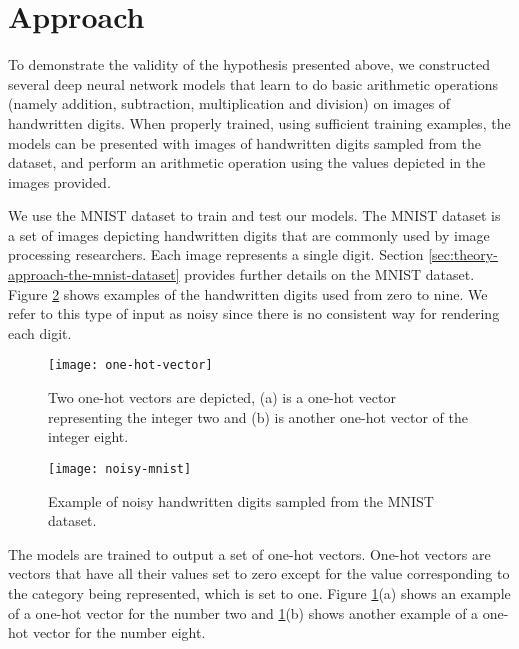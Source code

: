 \section{Approach} \label{sec:theory-approach}

To demonstrate the validity of the hypothesis presented above, we constructed several deep neural network models that learn to do basic arithmetic operations (namely addition, subtraction, multiplication and division) on images of handwritten digits. When properly trained, using sufficient training examples, the models can be presented with images of handwritten digits sampled from the dataset, and perform an arithmetic operation using the values depicted in the images provided.

We use the MNIST dataset to train and test our models. The MNIST dataset is a set of images depicting handwritten digits that are commonly used by image processing researchers\cite{MNIST}. Each image represents a single digit. Section \ref{sec:theory-approach-the-mnist-dataset} provides further details on the MNIST dataset. Figure \ref{fig:noisy-mnist} shows examples of the handwritten digits used from zero to nine. We refer to this type of input as noisy since there is no consistent way for rendering each digit. 

\begin{figure}[t]
	\centering
	\texttt{[image: one-hot-vector]}
	\caption{Two one-hot vectors are depicted, (a) is a one-hot vector representing the integer two and (b) is another one-hot vector of the integer eight.}
	\label{fig:one-hot-vector}
\end{figure}

\begin{figure}[t]
	\centering
	\texttt{[image: noisy-mnist]}
	\caption{Example of noisy handwritten digits sampled from the MNIST dataset.}
	\label{fig:noisy-mnist}
\end{figure}

The models are trained to output a set of one-hot vectors. One-hot vectors are vectors that have all their values set to zero except for the value corresponding to the category being represented, which is set to one. Figure \ref{fig:one-hot-vector}(a) shows an example of a one-hot vector for the number two and \ref{fig:one-hot-vector}(b) shows another example of a one-hot vector for the number eight.

